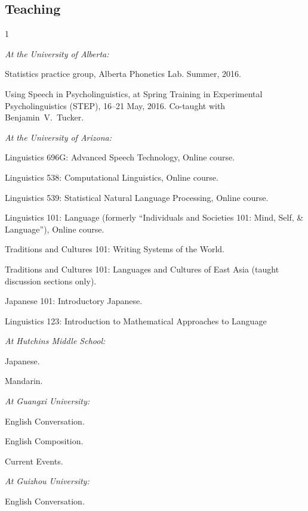 \subsection*{Teaching}
\begin{hangparas}{\indentThisMuch}{1}
\par \textit{At the University of Alberta:}
\par Statistics practice group, Alberta Phonetics Lab. Summer, 2016.
\par Using Speech in Psycholinguistics, at Spring Training in Experimental Psycholinguistics (STEP), 16--21 May, 2016. Co-taught with Benjamin~V.~Tucker.
\\
\par \textit{At the University of Arizona:}
\par Linguistics 696G: Advanced Speech Technology, Online course.
\par Linguistics 538: Computational Linguistics, Online course.
\par Linguistics 539: Statistical Natural Language Processing, Online course.
\par Linguistics 101: Language (formerly ``Individuals and Societies 101: Mind, Self, \& Language''), Online course.
\par Traditions and Cultures 101: Writing Systems of the World.
\par Traditions and Cultures 101: Languages and Cultures of East Asia (taught discussion sections only).
\par Japanese 101: Introductory Japanese.
\par Linguistics 123: Introduction to Mathematical Approaches to Language
\\
\par \textit{At Hutchins Middle School:}
\par Japanese.
\par Mandarin.
\\
\par \textit{At Guangxi University:}
\par English Conversation.
\par English Composition.
\par Current Events.
\\
\par \textit{At Guizhou University:}
\par English Conversation.
\end{hangparas}
